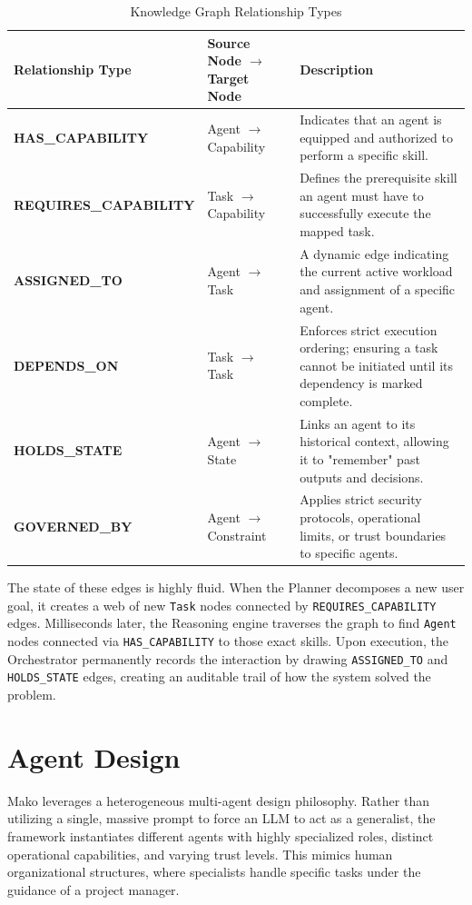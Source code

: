 \begin{table}[ht!]
    \centering
    \caption{Knowledge Graph Relationship Types}
    \label{tab:relationship_types}
    \begin{tabular}{|p{}|p{}|p{}|}
        \hline
        \textbf{Relationship Type} & \textbf{Source Node $\rightarrow$ Target Node} & \textbf{Description} \\
        \hline
        \textbf{HAS\_CAPABILITY} & Agent $\rightarrow$ Capability & Indicates that an agent is equipped and authorized to perform a specific skill. \\
        \hline
        \textbf{REQUIRES\_CAPABILITY} & Task $\rightarrow$ Capability & Defines the prerequisite skill an agent must have to successfully execute the mapped task. \\
        \hline
        \textbf{ASSIGNED\_TO} & Agent $\rightarrow$ Task & A dynamic edge indicating the current active workload and assignment of a specific agent. \\
        \hline
        \textbf{DEPENDS\_ON} & Task $\rightarrow$ Task & Enforces strict execution ordering; ensuring a task cannot be initiated until its dependency is marked complete. \\
        \hline
        \textbf{HOLDS\_STATE} & Agent $\rightarrow$ State & Links an agent to its historical context, allowing it to "remember" past outputs and decisions. \\
        \hline
        \textbf{GOVERNED\_BY} & Agent $\rightarrow$ Constraint & Applies strict security protocols, operational limits, or trust boundaries to specific agents. \\
        \hline
    \end{tabular}
\end{table}

The state of these edges is highly fluid. When the Planner decomposes a new user goal, it creates a web of new \texttt{Task} nodes connected by \texttt{REQUIRES\_CAPABILITY} edges. Milliseconds later, the Reasoning engine traverses the graph to find \texttt{Agent} nodes connected via \texttt{HAS\_CAPABILITY} to those exact skills. Upon execution, the Orchestrator permanently records the interaction by drawing \texttt{ASSIGNED\_TO} and \texttt{HOLDS\_STATE} edges, creating an auditable trail of how the system solved the problem.

\section{Agent Design}
Mako leverages a heterogeneous multi-agent design philosophy. Rather than utilizing a single, massive prompt to force an LLM to act as a generalist, the framework instantiates different agents with highly specialized roles, distinct operational capabilities, and varying trust levels. This mimics human organizational structures, where specialists handle specific tasks under the guidance of a project manager.

